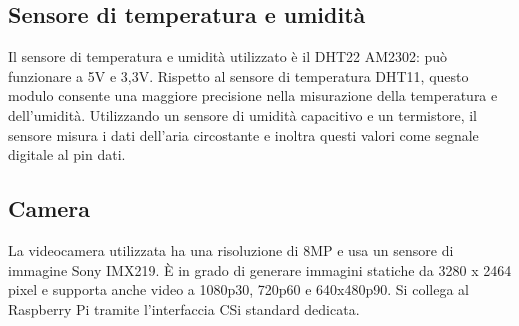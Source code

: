 \documentclass[italian,12pt,a4paper,oneside,final]{report}
\begin{document}
\subsection{Sensore di temperatura e umidità}
Il sensore di temperatura e umidità utilizzato è il DHT22 AM2302: può funzionare a 5V e 3,3V.
Rispetto al sensore di temperatura DHT11, questo modulo consente una maggiore precisione nella misurazione della temperatura e dell'umidità.
Utilizzando un sensore di umidità capacitivo e un termistore, il sensore misura i dati dell'aria circostante e inoltra questi valori come segnale digitale al pin dati.

\subsection{Camera}
La videocamera utilizzata ha una risoluzione di 8MP e usa un sensore di immagine Sony IMX219.
È in grado di generare immagini statiche da 3280 x 2464 pixel e supporta anche video a 1080p30, 720p60 e 640x480p90.
Si collega al Raspberry Pi tramite l’interfaccia CSi standard dedicata.

\newpage
\end{document}
